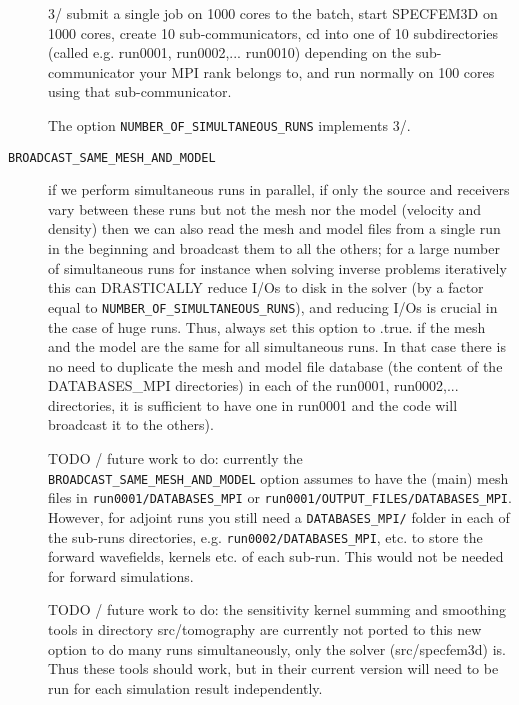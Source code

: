 \begin{description}
3/ submit a single job on 1000 cores to the batch, start SPECFEM3D on 1000 cores, create 10 sub-communicators,
cd into one of 10 subdirectories (called e.g. run0001, run0002,... run0010) depending on the sub-communicator
your MPI rank belongs to, and run normally on 100 cores using that sub-communicator.

The option \texttt{NUMBER\_OF\_SIMULTANEOUS\_RUNS} implements 3/.

\item [{\texttt{BROADCAST\_SAME\_MESH\_AND\_MODEL}}] if we perform simultaneous runs in parallel,
if only the source and receivers vary between these runs
but not the mesh nor the model (velocity and density) then we can also read the mesh and model files
from a single run in the beginning and broadcast them to all the others; for a large number of simultaneous
runs for instance when solving inverse problems iteratively this can DRASTICALLY reduce I/Os to disk in the solver
(by a factor equal to \texttt{NUMBER\_OF\_SIMULTANEOUS\_RUNS}), and reducing I/Os is crucial in the case of huge runs.
Thus, always set this option to .true. if the mesh and the model are the same for all simultaneous runs.
In that case there is no need to duplicate the mesh and model file database (the content of the DATABASES\_MPI
directories) in each of the run0001, run0002,... directories, it is sufficient to have one in run0001
and the code will broadcast it to the others).


TODO / future work to do: currently the \texttt{BROADCAST\_SAME\_MESH\_AND\_MODEL}
option assumes to have the (main) mesh files in \texttt{run0001/DATABASES\_MPI} or
\texttt{run0001/OUTPUT\_FILES/DATABASES\_MPI}.
However, for adjoint runs you still need a \texttt{DATABASES\_MPI/} folder in each of the sub-runs directories,
e.g. \texttt{run0002/DATABASES\_MPI}, etc. to store the forward wavefields, kernels etc. of each sub-run.
This would not be needed for forward simulations.

TODO / future work to do: the sensitivity kernel summing and smoothing tools in directory src/tomography are currently not ported to this new option to do many runs simultaneously, only the solver (src/specfem3d) is. Thus these tools should work, but in their current version will need to be run for each simulation result independently.


\end{description}
